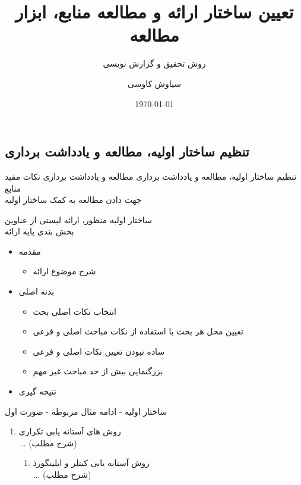 \documentclass[12pt]{beamer}
\title{تعیین ساختار ارائه و مطالعه منابع، ابزار مطالعه}
\subtitle{\color{black} روش تحقیق و گزارش نویسی}
\date{\today}
\author{سیاوش کاوسی}
\institute{دانشگاه صنعتی امیرکبیر}
\makeatletter
\newcommand{\rtlist}{\raggedleft\rightskip\@totalleftmargin}
\newcommand{\sectionfontsize}{\fontsize{22pt}{0pt}\selectfont}
\newcommand{\framefontsizelarge}{\fontsize{18pt}{0pt}\selectfont}
\newcommand{\frametitlefontsize}{\fontsize{20pt}{0pt}\selectfont}
\newcommand{\defaultvspace}{\vspace{5mm}}
\makeatother
\begin{document}
\begin{persian}
	\maketitle
	\everypar{\rightskip\rightmargin}		
	
	\section{\sectionfontsize تنظیم ساختار اولیه، مطالعه و یادداشت برداری}	
	
	\begin{frame}{\frametitlefontsize تنظیم ساختار اولیه، مطالعه و یادداشت برداری}
		\framefontsizelarge
		مطالعه و یادداشت برداری نکات مفید منابع \defaultvspace\\
		جهت دادن مطالعه به کمک ساختار اولیه
	\end{frame}	
	
	\begin{frame}{\frametitlefontsize ساختار اولیه}
		منظور، ارائه لیستی از عناوین \defaultvspace\\
		بخش بندی پایه ارائه
		\begin{itemize}\rtlist
			\item مقدمه
			\begin{itemize}\rtlist
				\item شرح موضوع ارائه
			\end{itemize}
			
			\item بدنه اصلی
			\begin{itemize}\rtlist
				\item انتخاب نکات اصلی بحث\\
				\item تعیین محل هر بحث با استفاده از نکات مباحث اصلی و فرعی
				\item ساده نبودن تعیین نکات اصلی و فرعی
				\item بزرگنمایی بیش از حد مباحث غیر مهم
			\end{itemize}
			
			\item نتیجه گیری
		\end{itemize}
	\end{frame}
	
	\begin{frame}{\frametitlefontsize ساختار اولیه - ادامه}
		مثال مربوطه - صورت اول
		\begin{enumerate}\rtlist
			\item روش های آستانه یابی تکراری
			\\ ... (شرح مطلب)
			\begin{enumerate}\rtlist
				\item روش آستانه یابی کیتلر و ایلینگورذ
				\\ ... (شرح مطلب)
			\end{enumerate}
			

\end{enumerate}
\end{frame}
\end{persian}
\end{document}
